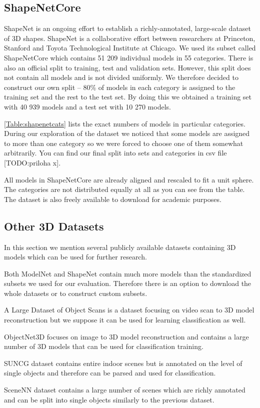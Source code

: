\subsection{ShapeNetCore}
ShapeNet \cite{chang_shapenet:_2015} is an ongoing effort to establish a richly-annotated, large-scale dataset of 3D shapes. ShapeNet is a collaborative effort between researchers at Princeton, Stanford and Toyota Technological Institute at Chicago. We used its subset called ShapeNetCore which contains 51 209 individual models in 55 categories. There is also an official split to training, test and validation sets. However, this split does not contain all models and is not divided uniformly. We therefore decided to construct our own split -- 80\% of models in each category is assigned to the training set and the rest to the test set. By doing this we obtained a training set with 40 939 models and a test set with 10 270 models. \par \autoref{Table:shapenetcats} lists the exact numbers of models in particular categories. During our exploration of the dataset we noticed that some models are assigned to more than one category so we were forced to choose one of them somewhat arbitrarily. You can find our final split into sets and categories in csv file [TODO:priloha x].\par



All models in ShapeNetCore are already aligned and rescaled to fit a unit sphere. The categories are not distributed equally at all as you can see from the table. The dataset is also freely available to download for academic purposes.




\subsection{Other 3D Datasets}
In this section we mention several publicly available datasets containing 3D models which can be used for further research. \par
Both ModelNet and ShapeNet contain much more models than the standardized subsets we used for our evaluation. Therefore there is an option to download the whole datasets or to construct custom subsets. \par
A Large Dataset of Object Scans \cite{choi_large_2016} is a dataset focusing on video scan to 3D model reconstruction but we suppose it can be used for learning classification as well.  \par
ObjectNet3D \cite{xiang_objectnet3d:_2016} focuses on image to 3D model reconstruction and contains a large number of 3D models that can be used for classification training.\par
SUNCG dataset \cite{song_semantic_2017} contains entire indoor scenes but is annotated on the level of single objects and therefore can be parsed and used for classification. \par
SceneNN \cite{hua_scenenn:_2016} dataset contains a large number of scenes which are richly annotated and can be split into single objects similarly to the previous dataset.

